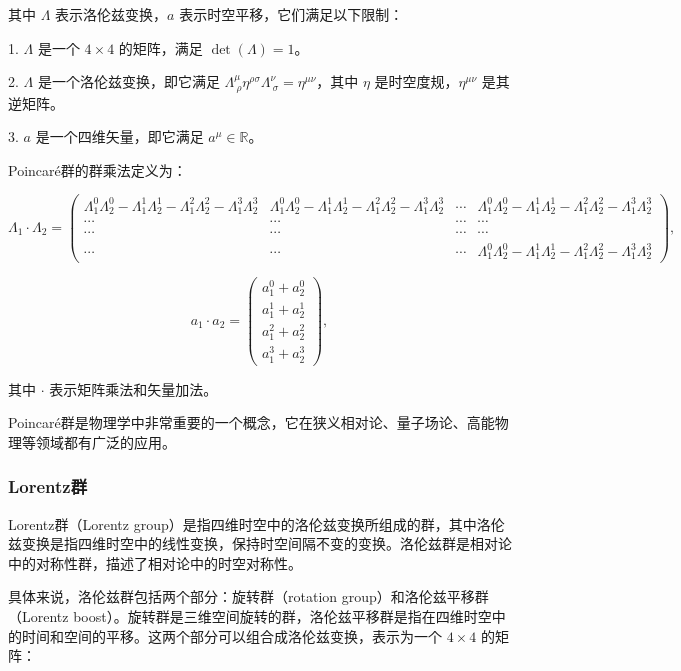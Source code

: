 \documentclass[UTF8,a4paper,11pt]{article}
\begin{document}
其中 $\Lambda$ 表示洛伦兹变换，$a$ 表示时空平移，它们满足以下限制：

1. $\Lambda$ 是一个 $4 \times 4$ 的矩阵，满足 $\det(\Lambda) = 1$。

2. $\Lambda$ 是一个洛伦兹变换，即它满足 $\Lambda^\mu_{\ \rho} \eta^{\rho\sigma} \Lambda^\nu_{\ \sigma} = \eta^{\mu\nu}$，其中 $\eta$ 是时空度规，$\eta^{\mu\nu}$ 是其逆矩阵。

3. $a$ 是一个四维矢量，即它满足 $a^\mu \in \mathbb{R}$。

Poincaré群的群乘法定义为：

$$
\Lambda_1 \cdot \Lambda_2 = \begin{pmatrix} \Lambda^0_1 \Lambda^0_2 - \Lambda^1_1 \Lambda^1_2 - \Lambda^2_1 \Lambda^2_2 - \Lambda^3_1 \Lambda^3_2 & \Lambda^0_1 \Lambda^0_2 - \Lambda^1_1 \Lambda^1_2 - \Lambda^2_1 \Lambda^2_2 - \Lambda^3_1 \Lambda^3_2 & \cdots & \Lambda^0_1 \Lambda^0_2 - \Lambda^1_1 \Lambda^1_2 - \Lambda^2_1 \Lambda^2_2 - \Lambda^3_1 \Lambda^3_2 \\ \cdots & \cdots & \cdots & \cdots \\ \cdots & \cdots & \cdots & \cdots \\ \cdots & \cdots & \cdots & \Lambda^0_1 \Lambda^0_2 - \Lambda^1_1 \Lambda^1_2 - \Lambda^2_1 \Lambda^2_2 - \Lambda^3_1 \Lambda^3_2 \end{pmatrix},
$$

$$
a_1 \cdot a_2 = \begin{pmatrix} a^0_1 + a^0_2 \\ a^1_1 + a^1_2 \\ a^2_1 + a^2_2 \\ a^3_1 + a^3_2 \end{pmatrix},
$$

其中 $\cdot$ 表示矩阵乘法和矢量加法。

Poincaré群是物理学中非常重要的一个概念，它在狭义相对论、量子场论、高能物理等领域都有广泛的应用。

\subsubsection{Lorentz群}
Lorentz群（Lorentz group）是指四维时空中的洛伦兹变换所组成的群，其中洛伦兹变换是指四维时空中的线性变换，保持时空间隔不变的变换。洛伦兹群是相对论中的对称性群，描述了相对论中的时空对称性。

具体来说，洛伦兹群包括两个部分：旋转群（rotation group）和洛伦兹平移群（Lorentz boost）。旋转群是三维空间旋转的群，洛伦兹平移群是指在四维时空中的时间和空间的平移。这两个部分可以组合成洛伦兹变换，表示为一个 $4\times4$ 的矩阵：
\end{document}
